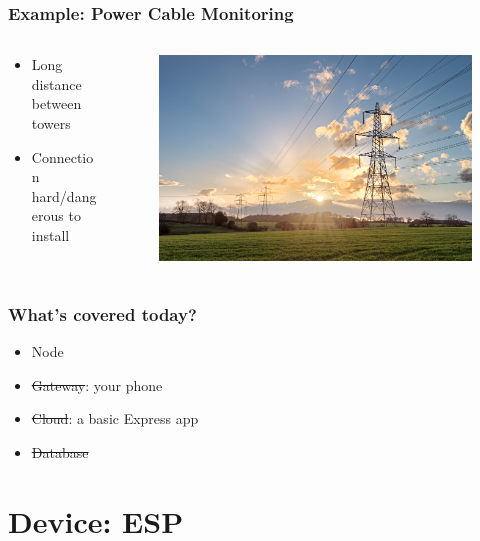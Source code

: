 \documentclass[compress, aspectratio=32]{beamer}
\begin{document}
\begin{frame}
    \frametitle{Example: Power Cable Monitoring}
    \begin{columns}
        \begin{column}{0.4\textwidth}
            \begin{itemize}
                \item Long distance between towers
                \item Connection hard/dangerous to install
            \end{itemize}
        \end{column}
        \begin{column}{0.6\textwidth}
            \begin{figure}
                \includegraphics[width=\textwidth]{AdobeStock_133386757.jpeg}
            \end{figure}
        \end{column}
    \end{columns}
\end{frame}

\begin{frame}
    \frametitle{What's covered today?}
    \begin{itemize}
        \item Node
        \item \st{Gateway}: your phone
        \item \st{Cloud}: a basic Express app
        \item \st{Database}~
    \end{itemize}
\end{frame}

\section{Device: ESP}
\end{document}
